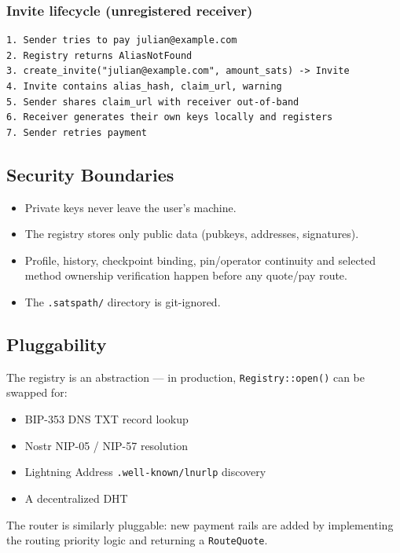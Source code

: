 \documentclass[
]{article}
\providecommand{\tightlist}{%
  \setlength{\itemsep}{0pt}\setlength{\parskip}{0pt}}
\begin{document}
\hypertarget{invite-lifecycle-unregistered-receiver}{%
\subsubsection{Invite lifecycle (unregistered
receiver)}\label{invite-lifecycle-unregistered-receiver}}

\begin{verbatim}
1. Sender tries to pay julian@example.com
2. Registry returns AliasNotFound
3. create_invite("julian@example.com", amount_sats) -> Invite
4. Invite contains alias_hash, claim_url, warning
5. Sender shares claim_url with receiver out-of-band
6. Receiver generates their own keys locally and registers
7. Sender retries payment
\end{verbatim}

\hypertarget{security-boundaries}{%
\subsection{Security Boundaries}\label{security-boundaries}}

\begin{itemize}
\tightlist
\item
  Private keys never leave the user's machine.
\item
  The registry stores only public data (pubkeys, addresses, signatures).
\item
  Profile, history, checkpoint binding, pin/operator continuity and
  selected method ownership verification happen before any quote/pay
  route.
\item
  The \texttt{.satspath/} directory is git-ignored.
\end{itemize}

\hypertarget{pluggability}{%
\subsection{Pluggability}\label{pluggability}}

The registry is an abstraction --- in production,
\texttt{Registry::open()} can be swapped for:

\begin{itemize}
\tightlist
\item
  BIP-353 DNS TXT record lookup
\item
  Nostr NIP-05 / NIP-57 resolution
\item
  Lightning Address \texttt{.well-known/lnurlp} discovery
\item
  A decentralized DHT
\end{itemize}

The router is similarly pluggable: new payment rails are added by
implementing the routing priority logic and returning a
\texttt{RouteQuote}.
\end{document}
